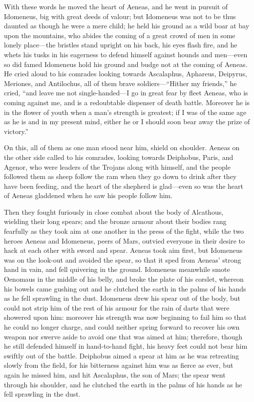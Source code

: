 With these words he moved the heart of Aeneas, and he went in pursuit of
Idomeneus, big with great deeds of valour; but Idomeneus was not to be
thus daunted as though he were a mere child; he held his ground as a wild
boar at bay upon the mountains, who abides the coming of a great crowd of
men in some lonely place—the bristles stand upright on his back, his
eyes flash fire, and he whets his tusks in his eagerness to defend himself
against hounds and men—even so did famed Idomeneus hold his ground
and budge not at the coming of Aeneas. He cried aloud to his comrades
looking towards Ascalaphus, Aphareus, Deipyrus, Meriones, and Antilochus,
all of them brave soldiers—“Hither my friends,” he cried, “and leave
me not single-handed—I go in great fear by fleet Aeneas, who is
coming against me, and is a redoubtable dispenser of death battle.
Moreover he is in the flower of youth when a man’s strength is greatest;
if I was of the same age as he is and in my present mind, either he or I
should soon bear away the prize of victory.”

On this, all of them as one man stood near him, shield on shoulder. Aeneas
on the other side called to his comrades, looking towards Deiphobus,
Paris, and Agenor, who were leaders of the Trojans along with himself, and
the people followed them as sheep follow the ram when they go down to
drink after they have been feeding, and the heart of the shepherd is glad—even
so was the heart of Aeneas gladdened when he saw his people follow him.

Then they fought furiously in close combat about the body of Alcathous,
wielding their long spears; and the bronze armour about their bodies rang
fearfully as they took aim at one another in the press of the fight, while
the two heroes Aeneas and Idomeneus, peers of Mars, outvied everyone in
their desire to hack at each other with sword and spear. Aeneas took aim
first, but Idomeneus was on the look-out and avoided the spear, so that it
sped from Aeneas’ strong hand in vain, and fell quivering in the ground.
Idomeneus meanwhile smote Oenomaus in the middle of his belly, and broke
the plate of his corslet, whereon his bowels came gushing out and he
clutched the earth in the palms of his hands as he fell sprawling in the
dust. Idomeneus drew his spear out of the body, but could not strip him of
the rest of his armour for the rain of darts that were showered upon him:
moreover his strength was now beginning to fail him so that he could no
longer charge, and could neither spring forward to recover his own weapon
nor swerve aside to avoid one that was aimed at him; therefore, though he
still defended himself in hand-to-hand fight, his heavy feet could not
bear him swiftly out of the battle. Deiphobus aimed a spear at him as he
was retreating slowly from the field, for his bitterness against him was
as fierce as ever, but again he missed him, and hit Ascalaphus, the son of
Mars; the spear went through his shoulder, and he clutched the earth in
the palms of his hands as he fell sprawling in the dust.

